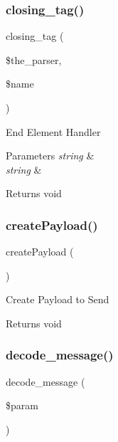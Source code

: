 \subsubsection{\texorpdfstring{closing\+\_\+tag()}{closing\_tag()}}
{\footnotesize\ttfamily closing\+\_\+tag (\begin{DoxyParamCaption}\item[{}]{\$the\+\_\+parser,  }\item[{}]{\$name }\end{DoxyParamCaption})}

End Element Handler


\begin{DoxyParams}{Parameters}
{\em string} & \\
\hline
{\em string} & \\
\hline
\end{DoxyParams}
\begin{DoxyReturn}{Returns}
void 
\end{DoxyReturn}
\mbox{\label{class_x_m_l___r_p_c___message_a9db0a53d149ebbb907ef60a27bbc9f1c}} 
\subsubsection{\texorpdfstring{create\+Payload()}{createPayload()}}
{\footnotesize\ttfamily create\+Payload (\begin{DoxyParamCaption}{ }\end{DoxyParamCaption})}

Create Payload to Send

\begin{DoxyReturn}{Returns}
void 
\end{DoxyReturn}
\mbox{\label{class_x_m_l___r_p_c___message_a76c958448d4b6569bfab9bfd2fb3dff0}} 
\subsubsection{\texorpdfstring{decode\+\_\+message()}{decode\_message()}}
{\footnotesize\ttfamily decode\+\_\+message (\begin{DoxyParamCaption}\item[{}]{\$param }\end{DoxyParamCaption})}

